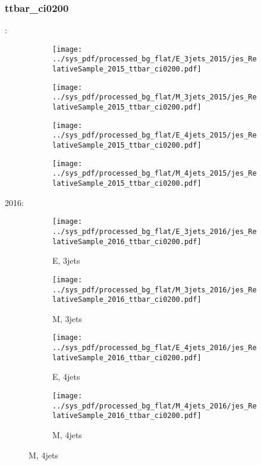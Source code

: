 \documentclass{beamer}
\begin{document}
\begin{frame}
\frametitle{ttbar_ci0200}
\fontsize{5}{1}:
\begin{figure}
\centering
\begin{subfigure}[b]{0.24\textwidth}
\texttt{[image: ../sys\_pdf/processed\_bg\_flat/E\_3jets\_2015/jes\_RelativeSample\_2015\_ttbar\_ci0200.pdf]}
\end{subfigure}
\begin{subfigure}[b]{0.24\textwidth}
\texttt{[image: ../sys\_pdf/processed\_bg\_flat/M\_3jets\_2015/jes\_RelativeSample\_2015\_ttbar\_ci0200.pdf]}
\end{subfigure}
\begin{subfigure}[b]{0.24\textwidth}
\texttt{[image: ../sys\_pdf/processed\_bg\_flat/E\_4jets\_2015/jes\_RelativeSample\_2015\_ttbar\_ci0200.pdf]}
\end{subfigure}
\begin{subfigure}[b]{0.24\textwidth}
\texttt{[image: ../sys\_pdf/processed\_bg\_flat/M\_4jets\_2015/jes\_RelativeSample\_2015\_ttbar\_ci0200.pdf]}
\end{subfigure}
\end{figure}
2016:
\begin{figure}
\centering
\begin{subfigure}[b]{0.24\textwidth}
\texttt{[image: ../sys\_pdf/processed\_bg\_flat/E\_3jets\_2016/jes\_RelativeSample\_2016\_ttbar\_ci0200.pdf]}
\captionsetup{font=tiny}
\caption{E, 3jets}
\end{subfigure}
\begin{subfigure}[b]{0.24\textwidth}
\texttt{[image: ../sys\_pdf/processed\_bg\_flat/M\_3jets\_2016/jes\_RelativeSample\_2016\_ttbar\_ci0200.pdf]}
\captionsetup{font=tiny}
\caption{M, 3jets}
\end{subfigure}
\begin{subfigure}[b]{0.24\textwidth}
\texttt{[image: ../sys\_pdf/processed\_bg\_flat/E\_4jets\_2016/jes\_RelativeSample\_2016\_ttbar\_ci0200.pdf]}
\captionsetup{font=tiny}
\caption{E, 4jets}
\end{subfigure}
\begin{subfigure}[b]{0.24\textwidth}
\texttt{[image: ../sys\_pdf/processed\_bg\_flat/M\_4jets\_2016/jes\_RelativeSample\_2016\_ttbar\_ci0200.pdf]}
\captionsetup{font=tiny}
\caption{M, 4jets}
\end{subfigure}
\end{figure}
\end{frame}
\end{document}
